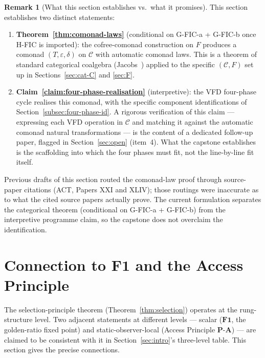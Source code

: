 \documentclass[11pt, a4paper]{amsart}
\theoremstyle{definition}
\newtheorem{remark}[theorem]{Remark}
\newcommand{\catC}{\mathcal{C}}
\begin{document}
\begin{remark}[What this section establishes vs.\ what it
  promises]
\label{rmk:comonad-status}
This section establishes two distinct statements:
\begin{enumerate}
\item \textbf{Theorem~\ref{thm:comonad-laws}} (conditional on G-FIC-a + G-FIC-b
  once H-FIC is imported): the cofree-comonad construction on
  $F$ produces a comonad $(T, \varepsilon, \delta)$ on $\catC$
  with automatic comonad laws. This is a theorem of standard
  categorical coalgebra (Jacobs~\cite{Jacobs2017}) applied to
  the specific $(\catC, F)$ set up in Sections~\ref{sec:cat-C}
  and \ref{sec:F}.
\item \textbf{Claim~\ref{claim:four-phase-realisation}}
  (interpretive): the VFD four-phase cycle realises this
  comonad, with the specific component identifications of
  Section~\ref{subsec:four-phase-id}. A rigorous verification
  of this claim — expressing each VFD operation in $\catC$ and
  matching it against the automatic comonad natural
  transformations — is the content of a dedicated follow-up
  paper, flagged in Section~\ref{sec:open} (item~4). What the
  capstone establishes is the scaffolding into which the four
  phases must fit, not the line-by-line fit itself.
\end{enumerate}
Previous drafts of this section routed the comonad-law proof
through source-paper citations (ACT, Papers XXI and XLIV);
those routings were inaccurate as to what the cited source
papers actually prove. The current formulation separates the
categorical theorem (conditional on G-FIC-a + G-FIC-b) from the
interpretive programme claim, so the capstone does not
overclaim the identification.
\end{remark}

\section{Connection to $\mathbf{F1}$ and the Access Principle}
\label{sec:connection}

The selection-principle theorem (Theorem~\ref{thm:selection})
operates at the rung-structure level. Two adjacent statements
at different levels — scalar ($\mathbf{F1}$, the golden-ratio
fixed point) and static-observer-local (Access Principle
$\mathbf{P\text{-}A}$) — are claimed to be consistent with it in
Section~\ref{sec:intro}'s three-level table. This section gives
the precise connections.
\end{document}
